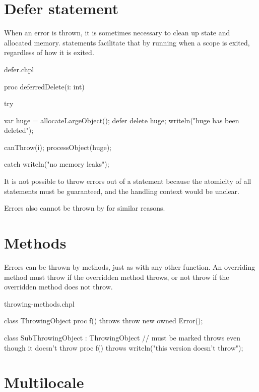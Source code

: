 \section{Defer statement}
\label{Errors_defer}

When an error is thrown, it is sometimes necessary to clean up state and
allocated memory.  statements facilitate that by running when a
scope is exited, regardless of how it is exited.

\begin{chapelexample}{defer.chpl}
\begin{chapel}
proc deferredDelete(i: int) {
  try {
    var huge = allocateLargeObject();
    defer {
      delete huge;
      writeln("huge has been deleted");
    }

    canThrow(i);
    processObject(huge);
  } catch {
    writeln("no memory leaks");
  }
}
\end{chapel}
\end{chapelexample}

It is not possible to throw errors out of a  statement because the
atomicity of all  statements must be guaranteed, and the handling
context would be unclear.

Errors also cannot be thrown by  for similar reasons.


\section{Methods}
\label{Errors_Methods}

Errors can be thrown by methods, just as with any other function.
An overriding method must throw if the overridden method throws,
or not throw if the overridden method does not throw.

\begin{chapelexample}{throwing-methods.chpl}
\begin{chapel}
class ThrowingObject {
  proc f() throws {
    throw new owned Error();
  }
}

class SubThrowingObject : ThrowingObject {
  // must be marked throws even though it doesn't throw
  proc f() throws {
    writeln("this version doesn't throw");
  }
}
\end{chapel}
\end{chapelexample}


\section{Multilocale}
\label{Errors_Multilocale}

